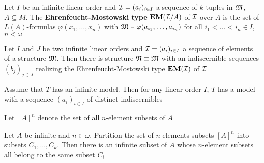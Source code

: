 \documentclass[11pt]{article}
\def \EM {\textbf{EM}}
\begin{document}
\begin{definition}[]
Let \(I\) be an infinite linear order and \(\mathcal{I}=(a_i)_{i\in I}\) a sequence of \(k\)-tuples
in \(\mathfrak{M}\), \(A\subseteq M\). The \textbf{Ehrenfeucht-Mostowski type} \(\EM(\cali/A)\) of \(\mathcal{I}\) over \(A\) is the set
of \(L(A)\)-formulas \(\varphi(x_1,\dots,x_n)\) with \(\mathfrak{M}\vDash\varphi(a_{i_1},\dots,a_{i_n})\) for all \(i_1<\dots<i_n\in I\), \(n<\omega\)
\end{definition}

\begin{lemma}
\label{lemma5.1.3}
Let \(I\) and \(J\) be two infinite linear orders and \(\mathcal{I}=(a_i)_{i\in I}\) a sequence of elements
of a structure \(\mathfrak{M}\). Then there is structure \(\mathfrak{N}\equiv\mathfrak{M}\) with an indiscernible
sequences \((b_j)_{j\in J}\) realizing the Ehrenfeucht-Mostowski type \(\EM(\cali)\) of \(\mathcal{I}\)
\end{lemma}

\begin{corollary}[]
Assume that \(T\) has an infinite model. Then for any linear order \(I\), \(T\) has a model with
a sequence \((a_i)_{i\in I}\) of distinct indiscernibles
\end{corollary}

Let \([A]^n\) denote the set of all \(n\)-element subsets of \(A\)

\begin{theorem}[Ramsey]
Let \(A\) be infinite and \(n\in\omega\). Partition the set of \(n\)-elements subsets \([A]^n\) into
subsets \(C_1,\dots,C_k\). Then there is an infinite subset of \(A\) whose \(n\)-element subsets all
belong to the same subset \(C_i\)
\end{theorem}
\end{document}
